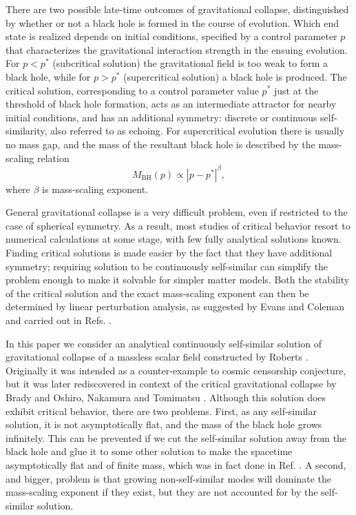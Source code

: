 There are two possible late-time outcomes of gravitational collapse,
distinguished by whether or not a black hole is formed in the course of
evolution. Which end state is realized depends on initial conditions,
specified by a control parameter $p$ that characterizes the
gravitational interaction strength in the ensuing evolution. For
$p<p^*$ (subcritical solution) the gravitational field is too weak to
form a black hole, while for $p>p^*$ (supercritical solution) a black
hole is produced. The critical solution, corresponding to a control
parameter value $p^*$ just at the threshold of black hole formation,
acts as an intermediate attractor for nearby initial conditions, and
has an additional symmetry: discrete or continuous self-similarity,
also referred to as echoing. For supercritical evolution there is
usually no mass gap, and the mass of the resultant black hole is
described by the mass-scaling relation
\begin{equation} \label{eq:scaling}
  M_{\text{BH}}(p) \propto |p-p^*|^\beta,
\end{equation}
where $\beta$ is mass-scaling exponent.

General gravitational collapse is a very difficult problem, even if
restricted to the case of spherical symmetry. As a result, most studies
of critical behavior resort to numerical calculations at some stage,
with few fully analytical solutions known. Finding critical solutions
is made easier by the fact that they have additional symmetry;
requiring solution to be continuously self-similar can simplify the
problem enough to make it solvable for simpler matter models. Both the
stability of the critical solution and the exact mass-scaling exponent
can then be determined by linear perturbation analysis, as suggested by
Evans and Coleman \cite{Evans&Coleman:94} and carried out in Refs.
\cite{Koike&Hara&Adachi:95,Hara&Koike&Adachi:96,Maison:96}.

In this paper we consider an analytical continuously self-similar
solution of gravitational collapse of a massless scalar field
constructed by Roberts \cite{Roberts:89}. Originally it was intended as
a counter-example to cosmic censorship conjecture, but it was later
rediscovered in context of the critical gravitational collapse by Brady
\cite{Brady:94} and Oshiro, Nakamura and Tomimatsu
\cite{Oshiro&Nakamura&Tomimatsu:94}. Although this solution does
exhibit critical behavior, there are two problems. First, as any
self-similar solution, it is not asymptotically flat, and the mass of
the black hole grows infinitely. This can be prevented if we cut the
self-similar solution away from the black hole and glue it to some
other solution to make the spacetime asymptotically flat and of finite
mass, which was in fact done in Ref. \cite{Wang&Oliveira:96}. A second,
and bigger, problem is that growing non-self-similar modes will
dominate the mass-scaling exponent if they exist, but they are not
accounted for by the self-similar solution.

